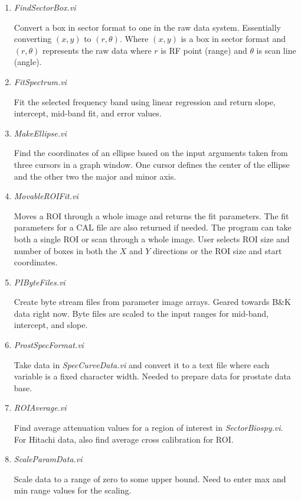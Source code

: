 \documentclass[10pt]{article}
\begin{document}
\begin{enumerate}
\item {\it FindSectorBox.vi}

Convert a box in sector format to one in the raw data system.
Essentially converting $(x,y)$ to $(r,\theta)$. Where $(x,y)$ is a
box in sector format and $(r,\theta)$ represents the raw data
where $r$ is RF point (range) and $\theta$ is scan line (angle).

\item {\it FitSpectrum.vi}

Fit the selected frequency band using linear regression and return
slope, intercept, mid-band fit, and error values.


\item {\it MakeEllipse.vi}

Find the coordinates of an ellipse based on the input arguments
taken from three cursors in a graph window. One cursor defines the
center of the ellipse and the other two the major and minor axis.

\item {\it MovableROIFit.vi}

Moves a ROI through a whole image and returns the fit parameters.
The fit parameters for a CAL file are also returned if needed. The
program can take both a single ROI or scan through a whole image.
User selects ROI size and number of boxes in both the $X$ and $Y$
directions or the ROI size and start coordinates.

\item {\it PIByteFiles.vi}

Create byte stream files from parameter image arrays. Geared
towards B\&K data right now. Byte files are scaled to the input
ranges for mid-band, intercept, and slope.


\item {\it ProstSpecFormat.vi}

Take data in {\it SpecCurveData.vi} and convert it to a text file
where each variable is a fixed character width. Needed to prepare
data for prostate data base.


\item {\it ROIAverage.vi}

Find average attenuation values for a region of interest in {\it
SectorBiospy.vi}. For Hitachi data, also find average cross
calibration for ROI.

\item {\it ScaleParamData.vi}

Scale data to a range of zero to some upper bound. Need to enter
max and min range values for the scaling.


\end{enumerate}
\end{document}
